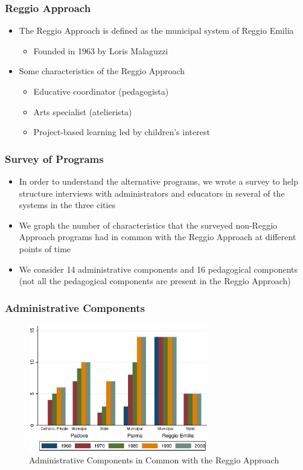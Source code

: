 \documentclass[static]{JJH-Beamer_PAGENOS}
\begin{document}
\begin{frame}
\frametitle{Reggio Approach}
\begin{itemize}
	\item The Reggio Approach is defined as the municipal system of Reggio Emilia
	\begin{itemize}
		\item Founded in 1963 by Loris Malaguzzi
	\end{itemize}
	\item Some characteristics of the Reggio Approach
	\begin{itemize}
		\item Educative coordinator (pedagogista)
		\item Arts specialist (atelierista)
		\item Project-based learning led by children's interest 
	\end{itemize}
\end{itemize}
\end{frame}


\begin{frame}
\frametitle{Survey of Programs}
\begin{itemize}
	\item In order to understand the alternative programs, we wrote a survey to help structure interviews with administrators and educators in several of the systems in the three cities
	\item We graph the number of characteristics that the surveyed non-Reggio Approach programs had in common with the Reggio Approach at different points of time
	\item We consider 14 administrative components and 16 pedagogical components (not all the pedagogical components are present in the Reggio Approach)
\end{itemize}
\end{frame}

\begin{frame}
\frametitle{Administrative Components}
\centering
\begin{figure}[H]
\caption{Administrative Components in Common with the Reggio Approach}
\includegraphics[width=0.7\textwidth]{../../output/aggregateAdministrative.eps}
\end{figure}
\end{frame}
\end{document}
